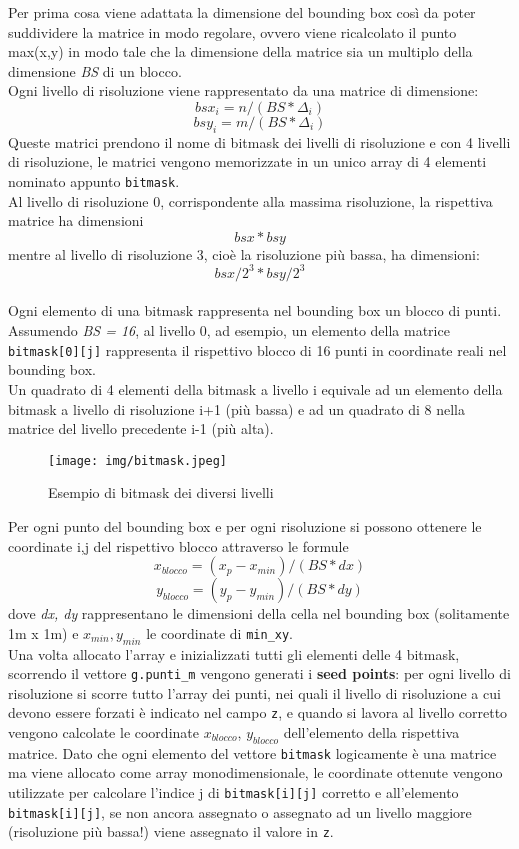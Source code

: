 			Per prima cosa viene adattata la dimensione del bounding box cos\`{i} da poter suddividere la matrice in modo regolare, ovvero viene ricalcolato il punto max(x,y) in modo tale che la dimensione della matrice sia un multiplo della dimensione \textit{BS} di un blocco.\\
			Ogni livello di risoluzione viene rappresentato da una matrice di dimensione:\\
			\[
				bsx_i = n / (BS * \Delta_i)
			\]
			\[
				bsy_i = m / (BS * \Delta_i) 
			\]
			Queste matrici prendono il nome di bitmask dei livelli di risoluzione e con 4 livelli di risoluzione, le matrici vengono memorizzate in un unico array di 4 elementi nominato appunto \texttt{bitmask}.\\
			Al livello di risoluzione 0, corrispondente alla massima risoluzione, la rispettiva matrice ha dimensioni \[bsx * bsy\] mentre al livello di risoluzione 3, cio\`{e} la risoluzione pi\`{u} bassa, ha dimensioni: \[bsx/2^3 * bsy/2^3\] \\
			Ogni elemento di una bitmask rappresenta nel bounding box un blocco di punti. Assumendo \textit{BS = 16}, al livello 0, ad esempio, un elemento della matrice \texttt{bitmask[0][j]} rappresenta il rispettivo blocco di 16 punti in coordinate reali nel bounding box.\\
			Un quadrato di 4 elementi della bitmask a livello i equivale ad un elemento della bitmask a livello di risoluzione i+1 (pi\`{u} bassa) e ad un quadrato di 8 nella matrice del livello precedente i-1 (pi\`{u} alta). 
			\begin{figure}[htbp]
				\centering
				\texttt{[image: img/bitmask.jpeg]}
				\caption{Esempio di bitmask dei diversi livelli}
			\end{figure}
			Per ogni punto del bounding box e per ogni risoluzione si possono ottenere le coordinate i,j del rispettivo blocco attraverso le formule
			\[
				x_{blocco} = (x_p - x_{min}) / (BS * dx) 
			\]
			\[
				y_{blocco} = (y_p - y_{min}) / (BS * dy) 
			\]
			dove \textit{dx, dy} rappresentano le dimensioni della cella nel bounding box (solitamente 1m x 1m) e $x_{min}, y_{min}$ le coordinate di \texttt{min\_xy}.\\
			Una volta allocato l'array e inizializzati tutti gli elementi delle 4 bitmask, scorrendo il vettore \texttt{g.punti\_m} vengono generati i \textbf{seed points}: per ogni livello di risoluzione si scorre tutto l'array dei punti, nei quali il livello di risoluzione a cui devono essere forzati \`{e} indicato nel campo \texttt{z}, e quando si lavora al livello corretto vengono calcolate le coordinate $x_{blocco}$, $y_{blocco}$ dell'elemento della rispettiva matrice. Dato che ogni elemento del vettore \texttt{bitmask} logicamente \`{e} una matrice ma viene allocato come array monodimensionale, le coordinate ottenute vengono utilizzate per calcolare l'indice j di \texttt{bitmask[i][j]} corretto e all'elemento \texttt{bitmask[i][j]}, se non ancora assegnato o assegnato ad un livello maggiore (risoluzione pi\`{u} bassa!) viene assegnato il valore in \texttt{z}.\\
